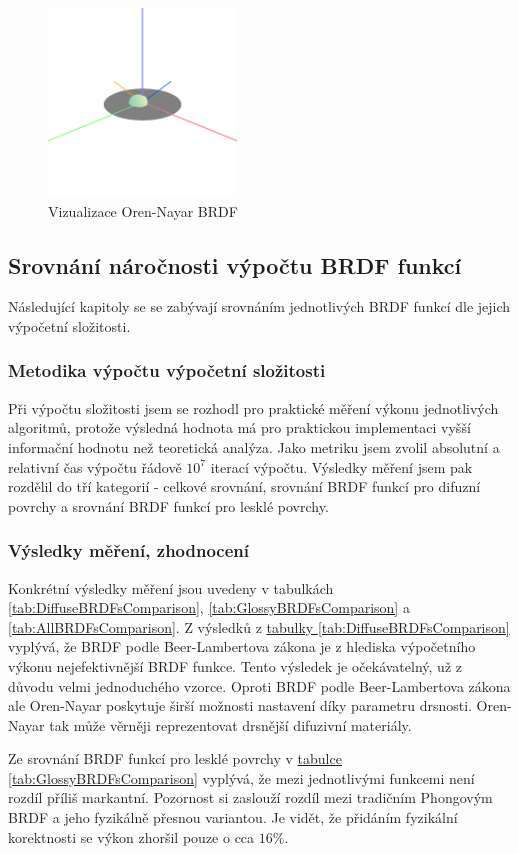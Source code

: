 \documentclass[czech,master]{diploma}
\begin{document}
\begin{figure}[ht]%
  \centering\includegraphics[width=5cm]{Figures/visualizations/brdfOrenNayar.png}%
  \caption{Vizualizace Oren-Nayar BRDF}%
  \label{fig:orenNayarBRDFRender}%
\end{figure}

\subsection{Srovnání náročnosti výpočtu BRDF funkcí}
Následující kapitoly se se zabývají srovnáním jednotlivých BRDF funkcí dle jejich výpočetní složitosti.
\subsubsection{Metodika výpočtu výpočetní složitosti}
Při výpočtu složitosti jsem se rozhodl pro praktické měření výkonu jednotlivých algoritmů, protože výsledná hodnota má pro praktickou implementaci vyšší informační hodnotu než teoretická analýza. Jako metriku jsem zvolil absolutní a relativní čas výpočtu řádově \(10^7\) iterací výpočtu. Výsledky měření jsem pak rozdělil do tří kategorií - celkové srovnání, srovnání BRDF funkcí pro difuzní povrchy a srovnání BRDF funkcí pro lesklé povrchy.

\subsubsection{Výsledky měření, zhodnocení}
Konkrétní výsledky měření jsou uvedeny v tabulkách \hyperref[tab:DiffuseBRDFsComparison]{\ref{tab:DiffuseBRDFsComparison}}, \hyperref[tab:GlossyBRDFsComparison]{\ref{tab:GlossyBRDFsComparison}} a \hyperref[tab:AllBRDFsComparison]{\ref{tab:AllBRDFsComparison}}.  Z výsledků z \hyperref[tab:DiffuseBRDFsComparison]{tabulky \ref{tab:DiffuseBRDFsComparison}} vyplývá, že BRDF podle Beer-Lambertova zákona je z hlediska výpočetního výkonu nejefektivnější BRDF funkce. Tento výsledek je očekávatelný, už z důvodu velmi jednoduchého vzorce. Oproti BRDF podle Beer-Lambertova zákona ale Oren-Nayar poskytuje širší možnosti nastavení díky parametru drsnosti. Oren-Nayar tak může věrněji reprezentovat drsnější difuzivní materiály.\par
Ze srovnání BRDF funkcí pro lesklé povrchy v \hyperref[tab:GlossyBRDFsComparison]{tabulce \ref{tab:GlossyBRDFsComparison}} vyplývá, že mezi jednotlivými funkcemi není rozdíl příliš markantní. Pozornost si zaslouží rozdíl mezi tradičním Phongovým BRDF a jeho fyzikálně přesnou variantou. Je vidět, že přidáním fyzikální korektnosti se výkon zhoršil pouze o cca \(16\%\).
\end{document}
